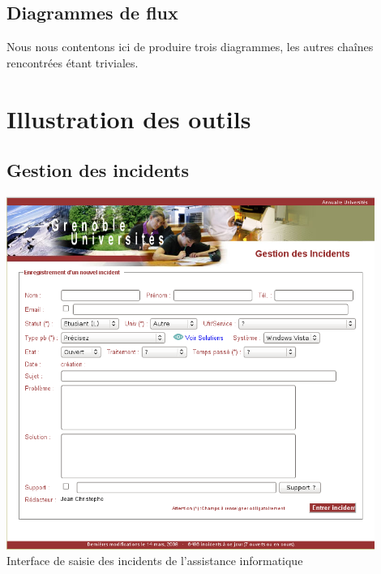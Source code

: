 \subsection{Diagrammes de flux}
\label{flux}

Nous nous contentons ici de produire trois diagrammes, les autres chaînes
rencontrées étant triviales.



\section{Illustration des outils}

\subsection{Gestion des incidents}
\label{gestion_incidents}
\begin{center}
	\includegraphics[width=12cm]{annexes/images/gestion_des_incidents.png} \\
	Interface de saisie des incidents de l'assistance informatique
\end{center}

